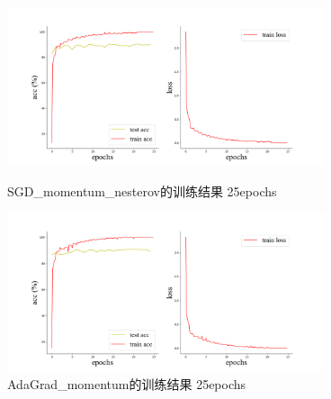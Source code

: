 \documentclass[10.5pt,a4paper]{article}%
\begin{document}
            \begin{figure}[H]
                    \centering
        	\begin{minipage}{0.48\textwidth}
        		\centering
        		\includegraphics[width=0.83\textwidth]{imgs_25e/SGD_momentum_nesterov.png}
        		\caption{\fontsize{10pt}{15pt}\selectfont SGD\_momentum\_nesterov的训练结果 25epochs}
        	\end{minipage}
        	\hspace{0cm}%
        	\hfill%
        	\begin{minipage}{0.48\textwidth}
        		\centering
        		\includegraphics[width=0.83\textwidth]{imgs_25e/AdaGrad.png}
        		\caption{\fontsize{10pt}{15pt}\selectfont AdaGrad\_momentum的训练结果 25epochs}
        	\end{minipage}
            \end{figure}  
\end{document}
